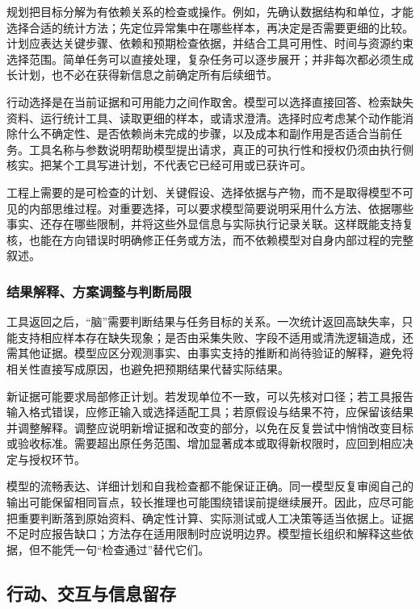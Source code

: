 \documentclass[11pt,a4paper]{article}
\begin{document}
规划把目标分解为有依赖关系的检查或操作。例如，先确认数据结构和单位，才能选择合适的统计方法；先定位异常集中在哪些样本，再决定是否需要更细的比较。计划应表达关键步骤、依赖和预期检查依据，并结合工具可用性、时间与资源约束选择范围。简单任务可以直接处理，复杂任务可以逐步展开；并非每次都必须生成长计划，也不必在获得新信息之前确定所有后续细节。

行动选择是在当前证据和可用能力之间作取舍。模型可以选择直接回答、检索缺失资料、运行统计工具、读取更细的样本，或请求澄清。选择时应考虑某个动作能消除什么不确定性、是否依赖尚未完成的步骤，以及成本和副作用是否适合当前任务。工具名称与参数说明帮助模型提出请求，真正的可执行性和授权仍须由执行侧核实。把某个工具写进计划，不代表它已经可用或已获许可。

工程上需要的是可检查的计划、关键假设、选择依据与产物，而不是取得模型不可见的内部思维过程。对重要选择，可以要求模型简要说明采用什么方法、依据哪些事实、还存在哪些限制，并将这些外显信息与实际执行记录关联。这样既能支持复核，也能在方向错误时明确修正任务或方法，而不依赖模型对自身内部过程的完整叙述。

\subsubsection{结果解释、方案调整与判断局限}

工具返回之后，“脑”需要判断结果与任务目标的关系。一次统计返回高缺失率，只能支持相应样本存在缺失现象；是否由采集失败、字段不适用或清洗逻辑造成，还需其他证据。模型应区分观测事实、由事实支持的推断和尚待验证的解释，避免将相关性直接写成原因，也避免把预期结果代替实际结果。

新证据可能要求局部修正计划。若发现单位不一致，可以先核对口径；若工具报告输入格式错误，应修正输入或选择适配工具；若原假设与结果不符，应保留该结果并调整解释。调整应说明新增证据和改变的部分，以免在反复尝试中悄悄改变目标或验收标准。需要超出原任务范围、增加显著成本或取得新权限时，应回到相应决定与授权环节。

模型的流畅表达、详细计划和自我检查都不能保证正确。同一模型反复审阅自己的输出可能保留相同盲点，较长推理也可能围绕错误前提继续展开。因此，应尽可能把重要判断落到原始资料、确定性计算、实际测试或人工决策等适当依据上。证据不足时应报告缺口；方法存在适用限制时应说明边界。模型擅长组织和解释这些依据，但不能凭一句“检查通过”替代它们。

\subsection{行动、交互与信息留存}
\label{sec:single-agent-capabilities}
\end{document}
